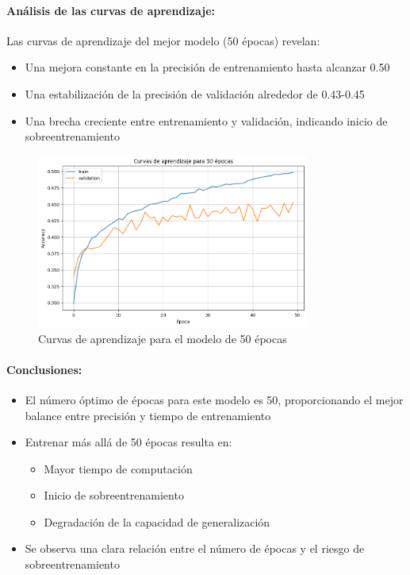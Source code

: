 \documentclass[11pt,a4paper]{article}
\begin{document}
\paragraph{Análisis de las curvas de aprendizaje:}
Las curvas de aprendizaje del mejor modelo (50 épocas) revelan:
\begin{itemize}
	\item Una mejora constante en la precisión de entrenamiento hasta alcanzar 0.50
	\item Una estabilización de la precisión de validación alrededor de 0.43-0.45
	\item Una brecha creciente entre entrenamiento y validación, indicando inicio de sobreentrenamiento
\end{itemize}

\begin{figure}[H]
	\centering
	\includegraphics[width=0.8\textwidth]{images/curvas_aprendizaje}
	\caption{Curvas de aprendizaje para el modelo de 50 épocas}
	\label{fig:curvas_aprendizaje}
\end{figure}

\paragraph{Conclusiones:}
\begin{itemize}
	\item El número óptimo de épocas para este modelo es 50, proporcionando el mejor balance entre precisión y tiempo de entrenamiento
	\item Entrenar más allá de 50 épocas resulta en:
	\begin{itemize}
		\item Mayor tiempo de computación
		\item Inicio de sobreentrenamiento
		\item Degradación de la capacidad de generalización
	\end{itemize}
	\item Se observa una clara relación entre el número de épocas y el riesgo de sobreentrenamiento
\end{itemize}
\end{document}
